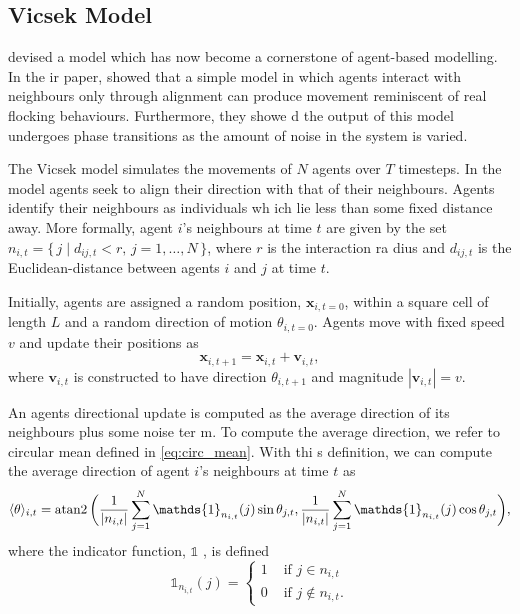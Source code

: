 \subsection{Vicsek Model}
\label{sec:vicsek_model}

\textcite{vicsek95} devised a model which has now become a cornerstone of agent-based modelling. In the
ir paper, \textcite{vicsek95} showed that a simple model in which agents interact with neighbours only 
through alignment can produce movement reminiscent of real flocking behaviours. Furthermore, they showe
d the output of this model undergoes phase transitions as the amount of noise in the system is varied.

The Vicsek model simulates the movements of $N$ agents over $T$ timesteps. In the model agents seek to 
align their direction with that of their neighbours. Agents identify their neighbours as individuals wh
ich lie less than some fixed distance away. More formally, agent $i$'s neighbours at time $t$ are given
 by the set $n_{i,t} = \{\,j \mid d_{ij, t} < r, \, j=1,\ldots,N \,\}$, where $r$ is the interaction ra
dius and $d_{ij, t}$ is the Euclidean-distance between agents $i$ and $j$ at time $t$.

Initially, agents are assigned a random position, $\bm{x}_{i, t=0}$, within a square cell of length $L$
 and a random direction of motion $\theta_{i, t=0}$. Agents move with fixed speed $v$ and update their 
positions as
\begin{equation}\label{eq:pos_update}
	\bm{x}_{i, t+1} = \bm{x}_{i, t} + \bm{v}_{i, t},
\end{equation}
where $\bm{v}_{i, t}$ is constructed to have direction $\theta_{i, t+1}$ and magnitude $|\bm{v}_{i, t}|
 = v$.

An agents directional update is computed as the average direction of its neighbours plus some noise ter
m. To compute the average direction, we refer to circular mean defined in \cref{eq:circ_mean}. With thi
s definition, we can compute the average direction of agent $i$'s neighbours at time $t$ as
\begin{equation}
\label{eq:vicsek_average}
	\langle \theta \rangle_{i, t} = \atantwo \bigg( \frac{1}{|n_{i, t}|} \sum_{j=1}^N \mathds{1}_{n_{i, t}
}(j) \sin{\theta_{j ,t}}, \frac{1}{|n_{i, t}|} \sum_{j=1}^N \mathds{1}_{n_{i, t}}(j)  \cos{\theta_{j, t
}} \bigg),
\end{equation}
where the indicator function, $\mathds{1}$ , is defined
\begin{equation*}
	\mathds{1}_{n_{i, t}}(j) =
	\begin{cases}
		1 & \text{ if } j \in n_{i, t} \\
		0 & \text{ if } j \notin n_{i, t}.
	\end{cases}
\end{equation*}

